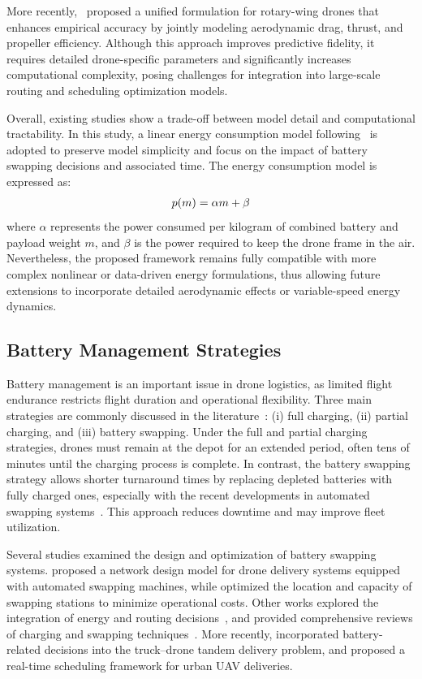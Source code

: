 \documentclass[3p, authoryear, 11pt]{elsarticle}
\begin{document}
More recently,~\citet{li_energy-consumption_2024} proposed a unified formulation for rotary-wing drones that enhances empirical accuracy by jointly modeling aerodynamic drag, thrust, and propeller efficiency. 
Although this approach improves predictive fidelity, it requires detailed drone-specific parameters and significantly increases computational complexity, posing challenges for integration into large-scale routing and scheduling optimization models.

Overall, existing studies show a trade-off between model detail and computational tractability. 
In this study, a linear energy consumption model following~\citet{dorling_vehicle_2017} is adopted to preserve model simplicity and focus on the impact of battery swapping decisions and associated time. The energy consumption model is expressed as:
\begin{align}
    p(m) = \alpha m + \beta \notag
    \label{eq:01}
\end{align}
where $\alpha$ represents the power consumed per kilogram of combined battery and payload weight $m$, and $\beta$ is the power required to keep the drone frame in the air.
Nevertheless, the proposed framework remains fully compatible with more complex nonlinear or data-driven energy formulations, thus allowing future extensions to incorporate detailed aerodynamic effects or variable-speed energy dynamics.

\subsection{Battery Management Strategies}

Battery management is an important issue in drone logistics, as limited flight endurance restricts flight duration and operational flexibility. 
Three main strategies are commonly discussed in the literature~\citep{liu_integrating_2025}: 
(i) full charging, 
(ii) partial charging, and 
(iii) battery swapping. 
Under the full and partial charging strategies, drones must remain at the depot for an extended period, often tens of minutes until the charging process is complete. 
In contrast, the battery swapping strategy allows shorter turnaround times by replacing depleted batteries with fully charged ones, especially with the recent developments in automated swapping systems~\citep{vilkki_automatic_2024,hoang_design_2024}. 
This approach reduces downtime and may improve fleet utilization.

Several studies examined the design and optimization of battery swapping systems. 
\citet{cokyasar_designing_2021} proposed a network design model for drone delivery systems equipped with automated swapping machines, while \citet{cokyasar_optimization_2021} optimized the location and capacity of swapping stations to minimize operational costs. 
Other works explored the integration of energy and routing decisions~\citep{dukkanci_minimizing_2021,wang_vehicle_2019}, and provided comprehensive reviews of charging and swapping techniques~\citep{mohsan_comprehensive_2022}. 
More recently, \citet{liu_integrating_2025} incorporated battery-related decisions into the truck–drone tandem delivery problem, and \citet{liu_realtime_2025} proposed a real-time scheduling framework for urban UAV deliveries.
\end{document}
